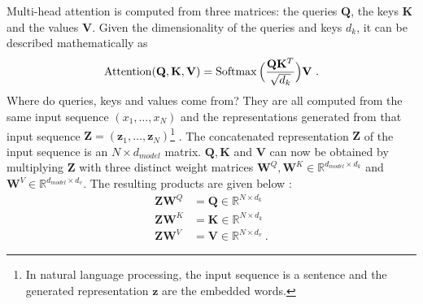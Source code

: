 Multi-head attention is computed from three matrices: the queries $\mathbf Q$, the keys $\mathbf K$ and the values $\mathbf V$. Given the dimensionality of the queries and keys $d_k$, it can be described mathematically as
\begin{gather}\label{eq:scaled_dot_product_attention}
    \operatorname{Attention}(\mathbf Q, \mathbf K, \mathbf V) = \operatorname{Softmax} \Big( \frac{\mathbf Q \mathbf K^T}{\sqrt{d_k}}  \Big) \mathbf V~.
\end{gather}
Where do queries, keys and values come from? They are all computed from the same input sequence $(x_1, \ldots, x_N)$ and the representations generated from that input sequence $\mathbf Z = (\mathbf z_1, \ldots, \mathbf z_N)$\footnote{In natural language processing, the input sequence is a sentence and the generated representation $\mathbf z$ are the embedded words.} \cite{vaswaniAttentionAllYou2017}. The concatenated representation $\mathbf Z$ of the input sequence is an $N \times d_{model}$ matrix. $\mathbf Q, \mathbf K$ and $\mathbf V$ can now be obtained by multiplying $\mathbf Z$ with three distinct weight matrices $\mathbf W^Q, \mathbf W^K \in \mathbb R^{d_{model} \times d_k}$ and $\mathbf W^V \in \mathbb R^{d_{model} \times d_v}$. The resulting products are given below \cite{vaswaniAttentionAllYou2017}:
\begin{align}
    \mathbf Z \mathbf W^Q & = \mathbf Q \in \mathbb R^{N \times d_k} \\
    \mathbf Z \mathbf W^K & = \mathbf K \in \mathbb R^{N \times d_k} \\
    \mathbf Z \mathbf W^V & = \mathbf V \in \mathbb R^{N \times d_v}~.
\end{align}
